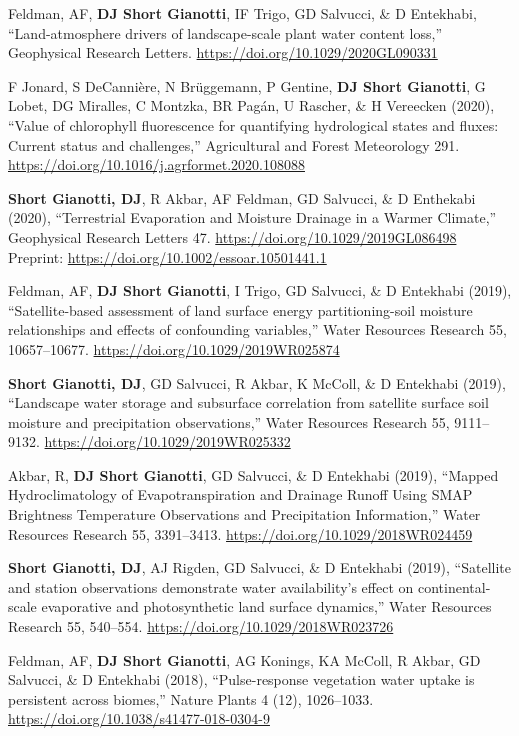 \documentclass[10pt, a4paper]{article}
\newcommand{\lbr}{\vspace*{12pt}}
\newcommand{\years}[1]{\mbox{}\marginnote{\scriptsize #1}} %
\begin{document}
\years{2020c}Feldman, AF, \textbf{DJ Short Gianotti}, IF Trigo, GD Salvucci, \& D Entekhabi, ``Land-atmosphere drivers of landscape-scale plant water content loss,'' Geophysical Research Letters. \url{https://doi.org/10.1029/2020GL090331}\lbr

\years{2020b}F Jonard, S DeCanni\`ere, N Br\"uggemann, P Gentine, \textbf{DJ Short Gianotti}, G Lobet, DG Miralles, C Montzka, BR Pag\'an, U Rascher, \& H Vereecken (2020), ``Value of chlorophyll fluorescence for quantifying hydrological states and fluxes: Current status and challenges,'' Agricultural and Forest Meteorology 291. \url{https://doi.org/10.1016/j.agrformet.2020.108088} \lbr

\noindent
\years{2020a}\textbf{Short Gianotti, DJ}, R Akbar, AF Feldman, GD Salvucci, \& D Enthekabi (2020), ``Terrestrial Evaporation and Moisture Drainage in a Warmer Climate,'' Geophysical Research Letters 47. \url{https://doi.org/10.1029/2019GL086498}\\ Preprint: \url{https://doi.org/10.1002/essoar.10501441.1}\lbr

\years{2019d}Feldman, AF, \textbf{DJ Short Gianotti}, I Trigo, GD Salvucci, \& D Entekhabi (2019), ``Satellite-based assessment of land surface energy partitioning-soil moisture relationships and effects of confounding variables,'' Water Resources Research 55, 10657--10677. \url{https://doi.org/10.1029/2019WR025874} \lbr

\years{2019c}\textbf{Short Gianotti, DJ}, GD Salvucci, R Akbar, K McColl, \& D Entekhabi (2019), ``Landscape water storage and subsurface correlation from satellite surface soil moisture and precipitation observations,'' Water Resources Research 55, 9111--9132. \url{https://doi.org/10.1029/2019WR025332} \lbr

\years{2019b}Akbar, R, \textbf{DJ Short Gianotti}, GD Salvucci, \& D Entekhabi (2019), ``Mapped Hydroclimatology of Evapotranspiration and Drainage Runoff Using SMAP Brightness Temperature Observations and Precipitation Information,'' Water Resources Research 55, 3391--3413. \url{https://doi.org/10.1029/2018WR024459}\lbr  

\years{2019a}\textbf{Short Gianotti, DJ}, AJ Rigden, GD Salvucci, \& D Entekhabi (2019), ``Satellite and station observations demonstrate water availability's effect on continental-scale evaporative and photosynthetic land surface dynamics,'' Water Resources Research 55, 540--554. \url{https://doi.org/10.1029/2018WR023726} \lbr

\years{2018e}Feldman, AF, \textbf{DJ Short Gianotti}, AG Konings, KA McColl, R Akbar, GD Salvucci, \& D Entekhabi (2018), ``Pulse-response vegetation water uptake is persistent across biomes,'' Nature Plants 4 (12), 1026--1033. \url{https://doi.org/10.1038/s41477-018-0304-9} \lbr
\end{document}
